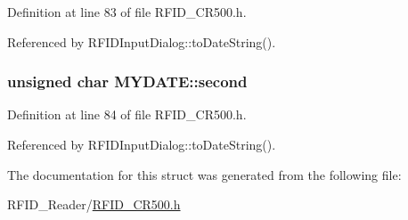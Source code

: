 Definition at line 83 of file RFID\_\-CR500.h.

Referenced by RFIDInputDialog::toDateString().\hypertarget{struct_m_y_d_a_t_e_063cbf62fc1c131f82e7b5ff7a3ec85f}{
\subsubsection[second]{\setlength{\rightskip}{0pt plus 5cm}unsigned char {\bf MYDATE::second}}}
\label{struct_m_y_d_a_t_e_063cbf62fc1c131f82e7b5ff7a3ec85f}




Definition at line 84 of file RFID\_\-CR500.h.

Referenced by RFIDInputDialog::toDateString().

The documentation for this struct was generated from the following file:\begin{CompactItemize}
\item 
RFID\_\-Reader/\hyperlink{_r_f_i_d___c_r500_8h}{RFID\_\-CR500.h}\end{CompactItemize}
